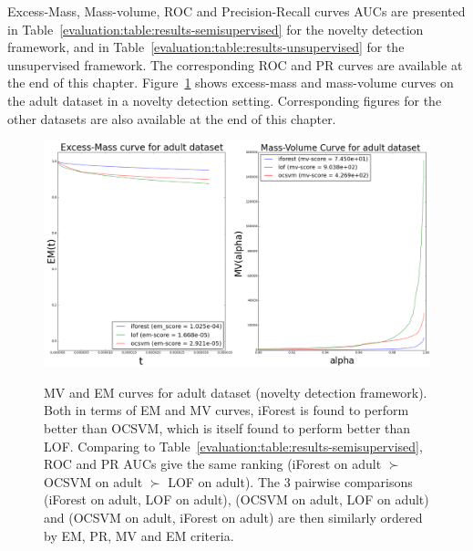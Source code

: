 Excess-Mass, Mass-volume, ROC and Precision-Recall curves AUCs are presented in Table~\ref{evaluation:table:results-semisupervised} for the novelty detection framework, and in Table~\ref{evaluation:table:results-unsupervised} for the unsupervised framework. The corresponding ROC and PR curves are available at the end of this chapter. %
%
Figure~\ref{evaluation:mv_em_adult} shows excess-mass and mass-volume curves on the adult dataset in a novelty detection setting. %
Corresponding figures for the other datasets are also available at the end of this chapter.

\begin{figure}[!ht]
  \centering
  \caption{MV and EM curves for adult dataset (novelty detection framework). Both in terms of EM and MV curves, iForest is found to perform better than OCSVM, which is itself found to perform better than LOF. Comparing to Table~\ref{evaluation:table:results-semisupervised}, ROC and PR AUCs give the same ranking (iForest on adult $\succ$ OCSVM on adult $\succ$ LOF on adult). The 3 pairwise comparisons (iForest on adult, LOF on adult), (OCSVM on adult, LOF on adult) and (OCSVM on adult, iForest on adult) are then similarly ordered by EM, PR, MV and EM criteria.}
  \includegraphics[width=\linewidth]{fig_source/evaluation_fig/mv_em_adult_supervised_09_factorized_inkscape.png}
\label{evaluation:mv_em_adult}
\end{figure}

